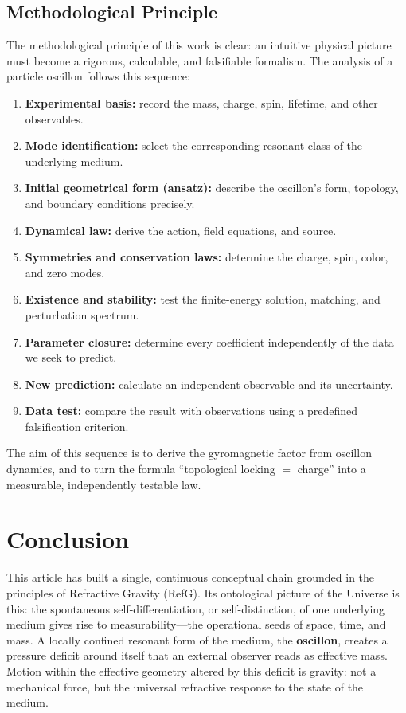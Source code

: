 \documentclass[11pt,a4paper]{article}
\begin{document}
\subsection{Methodological Principle}

The methodological principle of this work is clear: an intuitive physical picture must become a rigorous, calculable, and falsifiable formalism. The analysis of a particle oscillon follows this sequence:

\begin{enumerate}
\item \textbf{Experimental basis:} record the mass, charge, spin, lifetime, and other observables.
\item \textbf{Mode identification:} select the corresponding resonant class of the underlying medium.
\item \textbf{Initial geometrical form (ansatz):} describe the oscillon's form, topology, and boundary conditions precisely.
\item \textbf{Dynamical law:} derive the action, field equations, and source.
\item \textbf{Symmetries and conservation laws:} determine the charge, spin, color, and zero modes.
\item \textbf{Existence and stability:} test the finite-energy solution, matching, and perturbation spectrum.
\item \textbf{Parameter closure:} determine every coefficient independently of the data we seek to predict.
\item \textbf{New prediction:} calculate an independent observable and its uncertainty.
\item \textbf{Data test:} compare the result with observations using a predefined falsification criterion.
\end{enumerate}

The aim of this sequence is to derive the gyromagnetic factor from oscillon dynamics, and to turn the formula ``topological locking $=$ charge'' into a measurable, independently testable law.

\section*{Conclusion}

This article has built a single, continuous conceptual chain grounded in the principles of Refractive Gravity (RefG). Its ontological picture of the Universe is this: the spontaneous self-differentiation, or self-distinction, of one underlying medium gives rise to measurability---the operational seeds of space, time, and mass. A locally confined resonant form of the medium, the \textbf{oscillon}, creates a pressure deficit around itself that an external observer reads as effective mass. Motion within the effective geometry altered by this deficit is gravity: not a mechanical force, but the universal refractive response to the state of the medium.
\end{document}
